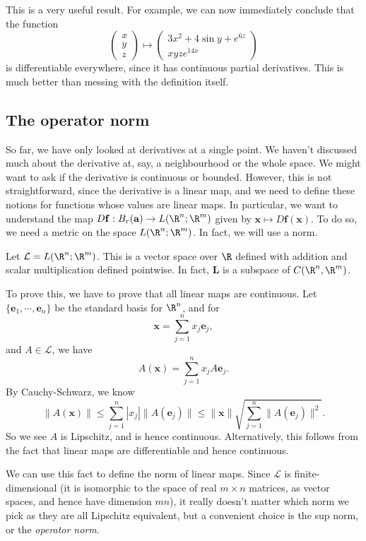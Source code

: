 \documentclass[a4paper]{article}
\begin{document}
This is a very useful result. For example, we can now immediately conclude that the function
\[
  \begin{pmatrix}
    x\\y\\z
  \end{pmatrix}
  \mapsto
  \begin{pmatrix}
    3x^2 + 4\sin y + e^{6z}\\
    xyze^{14x}
  \end{pmatrix}
\]
is differentiable everywhere, since it has continuous partial derivatives. This is much better than messing with the definition itself.

\subsection{The operator norm}
So far, we have only looked at derivatives at a single point. We haven't discussed much about the derivative at, say, a neighbourhood or the whole space. We might want to ask if the derivative is continuous or bounded. However, this is not straightforward, since the derivative is a linear map, and we need to define these notions for functions whose values are linear maps. In particular, we want to understand the map $D\mathbf{f}: B_r(\mathbf{a}) \to L(\R^n; \R^m)$ given by $\mathbf{x} \mapsto D \mathbf{f}(\mathbf{x})$. To do so, we need a metric on the space $L(\R^n; \R^m)$. In fact, we will use a norm.

Let $\mathcal{L} = L(\R^n; \R^m)$. This is a vector space over $\R$ defined with addition and scalar multiplication defined pointwise. In fact, $\mathbf{L}$ is a subspace of $C(\R^n, \R^m)$.

To prove this, we have to prove that all linear maps are continuous. Let $\{\mathbf{e}_1, \cdots, \mathbf{e}_n\}$ be the standard basis for $\R^n$, and for
\[
  \mathbf{x} = \sum_{j = 1}^n x_j \mathbf{e}_j,
\]
and $A \in \mathcal{L}$, we have
\[
  A (\mathbf{x}) = \sum_{j = 1}^n x_j A \mathbf{e}_j.
\]
By Cauchy-Schwarz, we know
\[
  \|A(\mathbf{x})\| \leq \sum_{j = 1}^n |x_j| \|A(\mathbf{e}_j)\| \leq \|\mathbf{x}\| \sqrt{\sum_{j = 1}^n \|A (\mathbf{e}_j)\|^2}.
\]
So we see $A$ is Lipschitz, and is hence continuous. Alternatively, this follows from the fact that linear maps are differentiable and hence continuous.

We can use this fact to define the norm of linear maps. Since $\mathcal{L}$ is finite-dimensional (it is isomorphic to the space of real $m\times n$ matrices, as vector spaces, and hence have dimension $mn$), it really doesn't matter which norm we pick as they are all Lipschitz equivalent, but a convenient choice is the sup norm, or the \emph{operator norm}.
\end{document}
